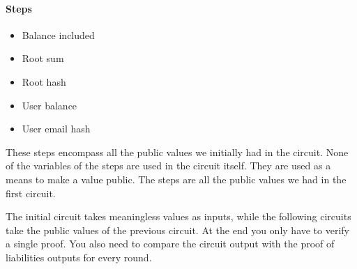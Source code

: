 \paragraph{Steps}
\begin{itemize}
   \item Balance included
   \item Root sum
   \item Root hash
   \item User balance
   \item User email hash
   \end{itemize}
These steps encompass all the public values we initially had in the circuit.
None of the variables of the steps are used in the circuit itself. They are used as a means to make a value public.
The steps are all the public values we had in the first circuit.

The initial circuit takes meaningless values as inputs, while the following circuits take the public values of the previous circuit.
At the end you only have to verify a single proof. You also need to compare the circuit output with the proof of liabilities outputs for every round.

